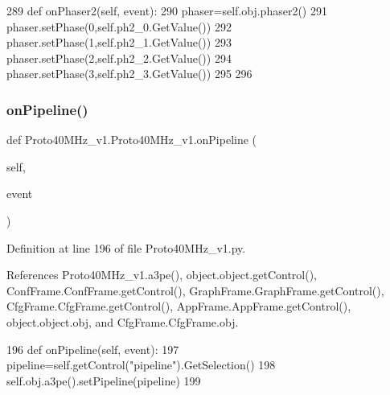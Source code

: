 \begin{DoxyCode}
289     \textcolor{keyword}{def }onPhaser2(self, event):
290         phaser=self.obj.phaser2()
291         phaser.setPhase(0,self.ph2\_0.GetValue())
292         phaser.setPhase(1,self.ph2\_1.GetValue())
293         phaser.setPhase(2,self.ph2\_2.GetValue())
294         phaser.setPhase(3,self.ph2\_3.GetValue())
295 
296 
\end{DoxyCode}
\mbox{\label{classProto40MHz__v1_1_1Proto40MHz__v1_aa4039f9fab5ec8b17cda49278e146bb8}} 
\subsubsection{\texorpdfstring{on\+Pipeline()}{onPipeline()}}
{\footnotesize\ttfamily def Proto40\+M\+Hz\+\_\+v1.\+Proto40\+M\+Hz\+\_\+v1.\+on\+Pipeline (\begin{DoxyParamCaption}\item[{}]{self,  }\item[{}]{event }\end{DoxyParamCaption})}



Definition at line 196 of file Proto40\+M\+Hz\+\_\+v1.\+py.



References Proto40\+M\+Hz\+\_\+v1.\+a3pe(), object.\+object.\+get\+Control(), Conf\+Frame.\+Conf\+Frame.\+get\+Control(), Graph\+Frame.\+Graph\+Frame.\+get\+Control(), Cfg\+Frame.\+Cfg\+Frame.\+get\+Control(), App\+Frame.\+App\+Frame.\+get\+Control(), object.\+object.\+obj, and Cfg\+Frame.\+Cfg\+Frame.\+obj.


\begin{DoxyCode}
196     \textcolor{keyword}{def }onPipeline(self, event):
197         pipeline=self.getControl(\textcolor{stringliteral}{"pipeline"}).GetSelection()
198         self.obj.a3pe().setPipeline(pipeline)
199 
\end{DoxyCode}
\mbox{\label{classProto40MHz__v1_1_1Proto40MHz__v1_af4681815eba15ad08b366382e6724208}} 
